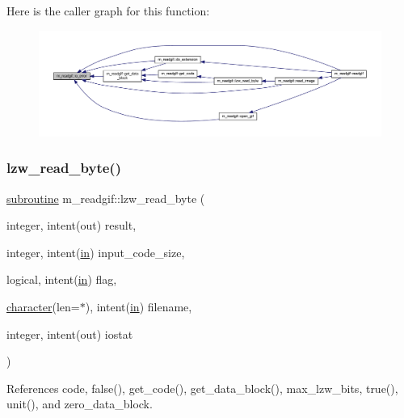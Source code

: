 Here is the caller graph for this function\+:
\nopagebreak
\begin{figure}[H]
\begin{center}
\leavevmode
\includegraphics[width=350pt]{namespacem__readgif_ae01d3edbe9e15bf4dd33070581e26fee_icgraph}
\end{center}
\end{figure}
\mbox{\label{namespacem__readgif_a314e657d0662360266bac5702a657ef1}} 
\subsubsection{\texorpdfstring{lzw\+\_\+read\+\_\+byte()}{lzw\_read\_byte()}}
{\footnotesize\ttfamily \hyperlink{M__stopwatch_83_8txt_acfbcff50169d691ff02d4a123ed70482}{subroutine} m\+\_\+readgif\+::lzw\+\_\+read\+\_\+byte (\begin{DoxyParamCaption}\item[{integer, intent(out)}]{result,  }\item[{integer, intent(\hyperlink{M__journal_83_8txt_afce72651d1eed785a2132bee863b2f38}{in})}]{input\+\_\+code\+\_\+size,  }\item[{logical, intent(\hyperlink{M__journal_83_8txt_afce72651d1eed785a2132bee863b2f38}{in})}]{flag,  }\item[{\hyperlink{option__stopwatch_83_8txt_abd4b21fbbd175834027b5224bfe97e66}{character}(len=$\ast$), intent(\hyperlink{M__journal_83_8txt_afce72651d1eed785a2132bee863b2f38}{in})}]{filename,  }\item[{integer, intent(out)}]{iostat }\end{DoxyParamCaption})\hspace{0.3cm}{\ttfamily [private]}}



References code, false(), get\+\_\+code(), get\+\_\+data\+\_\+block(), max\+\_\+lzw\+\_\+bits, true(), unit(), and zero\+\_\+data\+\_\+block.

